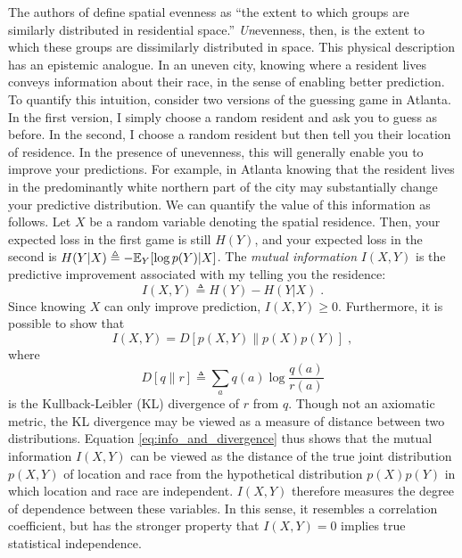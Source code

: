 \documentclass[english]{scrartcl}
\begin{document}
		The authors of \cite{Reardon2004} define spatial evenness as ``the extent to which groups are similarly distributed in residential space.'' \emph{Un}evenness, then, is the extent to which these groups are dissimilarly distributed in space. This physical description has an epistemic analogue. In an uneven city, knowing where a resident lives conveys information about their race, in the sense of enabling better prediction. To quantify this intuition, consider two versions of the guessing game in Atlanta. In the first version, I simply choose a random resident and ask you to guess as before. In the second, I choose a random resident but then tell you their location of residence. In the presence of unevenness, this will generally enable you to improve your predictions. For example, in Atlanta knowing that the resident lives in the predominantly white northern part of the city may substantially change your predictive distribution. We can quantify the value of this information as follows. Let $X$ be a random variable denoting the spatial residence. Then, your expected loss in the first game is still $H(Y)$, and your expected loss in the second is $H(Y|X) \triangleq -\mathbb{E}_{Y}[\log p(Y)|X]$. The \emph{mutual information} $I(X,Y)$ is the predictive improvement associated with my telling you the residence: 
		\begin{equation*}
			 I(X,Y) \triangleq H(Y) - H(Y|X)\;.
		\end{equation*}
		Since knowing $X$ can only improve prediction, $I(X,Y) \geq 0$. Furthermore, it is possible to show that 
		\begin{equation}
			I(X,Y) = D[p(X,Y)\|p(X)p(Y)]\;, \label{eq:info_and_divergence}
		\end{equation}
		where 
		\begin{equation*}
			D[q\|r] \triangleq \sum_a q(a) \log \frac{q(a)}{r(a)}
		\end{equation*}
		is the Kullback-Leibler (KL) divergence of $r$ from $q$. Though not an axiomatic metric, the KL divergence may be viewed as a measure of distance between two distributions. Equation \eqref{eq:info_and_divergence} thus shows that the mutual information $I(X,Y)$ can be viewed as the distance of the true joint distribution $p(X,Y)$ of location and race from the hypothetical distribution $p(X)p(Y)$ in which location and race are independent. $I(X,Y)$ therefore measures the degree of dependence between these variables. In this sense, it resembles a correlation coefficient, but has the stronger property that $I(X,Y) = 0$ implies true statistical independence. 
\end{document}
